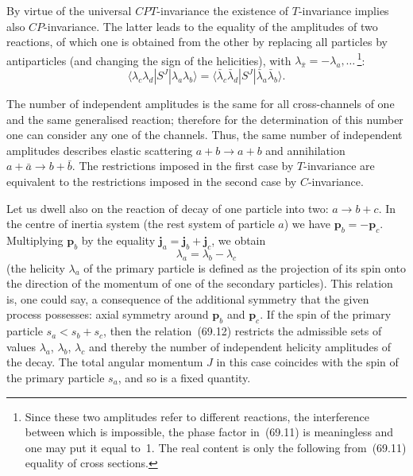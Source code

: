 By virtue of the universal $CPT$-invariance the existence of $T$-invariance implies also $CP$-invariance. The latter leads to the equality of the amplitudes of two reactions, of which one is obtained from the other by replacing all particles by antiparticles (and changing the sign of the helicities), with $\lambda_{\bar{\pi}} = -\lambda_a, \ldots$\,\footnote{Since these two amplitudes refer to different reactions, the interference between which is impossible, the phase factor in~(69.11) is meaningless and one may put it equal to~1. The real content is only the following from~(69.11) equality of cross sections.}:
\begin{equation}
\langle\lambda_c\lambda_d|S^J|\lambda_a\lambda_b\rangle = \langle\bar{\lambda}_c\bar{\lambda}_d|S^J|\bar{\lambda}_a\bar{\lambda}_b\rangle.
\tag{69.11}
\end{equation}

The number of independent amplitudes is the same for all cross-channels of one and the same generalised reaction; therefore for the determination of this number one can consider any one of the channels. Thus, the same number of independent amplitudes describes elastic scattering $a + b \to a + b$ and annihilation $a + \bar{a} \to b + \bar{b}$. The restrictions imposed in the first case by $T$-invariance are equivalent to the restrictions imposed in the second case by $C$-invariance.

Let us dwell also on the reaction of decay of one particle into two: $a \to b + c$. In the centre of inertia system (the rest system of particle $a$) we have $\mathbf{p}_b = -\mathbf{p}_c$. Multiplying $\mathbf{p}_b$ by the equality $\mathbf{j}_a = \mathbf{j}_b + \mathbf{j}_c$, we obtain
\begin{equation}
\lambda_a = \lambda_b - \lambda_c
\tag{69.12}
\end{equation}
(the helicity $\lambda_a$ of the primary particle is defined as the projection of its spin onto the direction of the momentum of one of the secondary particles). This relation is, one could say, a consequence of the additional symmetry that the given process possesses: axial symmetry around $\mathbf{p}_b$ and $\mathbf{p}_c$. If the spin of the primary particle $s_a < s_b + s_c$, then the relation~(69.12) restricts the admissible sets of values $\lambda_a$, $\lambda_b$, $\lambda_c$ and thereby the number of independent helicity amplitudes of the decay. The total angular momentum $J$ in this case coincides with the spin of the primary particle $s_a$, and so is a fixed quantity.

